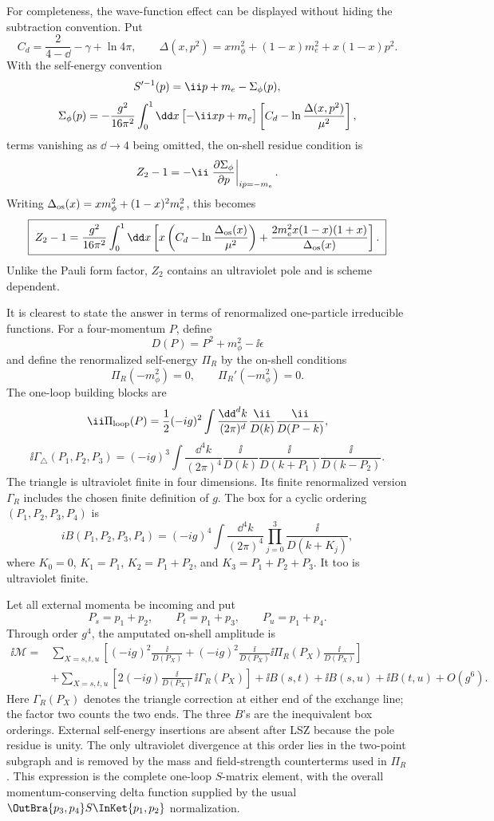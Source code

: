 \begin{enumerate}
For completeness, the wave-function effect can be displayed without hiding
the subtraction convention.  Put
\[
 C_d=\frac{2}{4-\dd}-\gamma+\ln4\pi,\qquad
 \Delta(x,p^2)=xm_\phi^2+(1-x)m_e^2+x(1-x)p^2 .
\]
With the self-energy convention
\[
 S'^{-1}(p)=\ii\sl p+m_e-\Sigma_\phi(p),
\]
\[
 \Sigma_\phi(p)=-\frac{g^2}{16\pi^2}\int_0^1\dd x\,
 \bigl[-\ii x\sl p+m_e\bigr]
 \left[C_d-\ln\frac{\Delta(x,p^2)}{\mu^2}\right],
\]
terms vanishing as \(\dd\to4\) being omitted, the on-shell residue condition
is
\[
 Z_2-1=-\ii\left.
 \frac{\partial\Sigma_\phi}{\partial\sl p}\right|_{i\sl p=-m_e}.
\]
Writing
\(\Delta_{\rm os}(x)=xm_\phi^2+(1-x)^2m_e^2\), this becomes
\[
 \boxed{\;
 Z_2-1=\frac{g^2}{16\pi^2}\int_0^1\dd x
 \left[
 x\left(C_d-\ln\frac{\Delta_{\rm os}(x)}{\mu^2}\right)
 +
 \frac{2m_e^2x(1-x)(1+x)}{\Delta_{\rm os}(x)}
 \right].
 \;}
\]
Unlike the Pauli form factor, \(Z_2\) contains an ultraviolet pole and is
scheme dependent.

It is clearest to state the answer in terms of renormalized one-particle
irreducible functions.  For a four-momentum \(P\), define
\[
 D(P)=P^2+m_\phi^2-\ii\epsilon
\]
and define the renormalized self-energy \(\Pi_R\) by the on-shell conditions
\[
 \Pi_R(-m_\phi^2)=0,\qquad
 \Pi_R'(-m_\phi^2)=0.
\]
The one-loop building blocks are
\[
 \ii\Pi_{\rm loop}(P)
 =\frac12(-ig)^2\int\frac{\dd^dk}{(2\pi)^d}
 \frac{\ii}{D(k)}\frac{\ii}{D(P-k)},
\]
\[
 \ii\Gamma_{\triangle}(P_1,P_2,P_3)
 =(-ig)^3\int\frac{\dd^4k}{(2\pi)^4}
 \frac{\ii}{D(k)}
 \frac{\ii}{D(k+P_1)}
 \frac{\ii}{D(k-P_2)} .
\]
The triangle is ultraviolet finite in four dimensions.  Its finite
renormalized version \(\Gamma_R\) includes the chosen finite definition of
\(g\).  The box for a cyclic ordering \((P_1,P_2,P_3,P_4)\) is
\[
 iB(P_1,P_2,P_3,P_4)
 =(-ig)^4\int\frac{\dd^4k}{(2\pi)^4}
 \prod_{j=0}^{3}\frac{\ii}{D(k+K_j)},
\]
where \(K_0=0\), \(K_1=P_1\), \(K_2=P_1+P_2\), and
\(K_3=P_1+P_2+P_3\).  It too is ultraviolet finite.

Let all external momenta be incoming and put
\[
 P_s=p_1+p_2,\qquad P_t=p_1+p_3,\qquad P_u=p_1+p_4.
\]
Through order \(g^4\), the amputated on-shell amplitude is
\[
\begin{aligned}
 \ii\mathcal M={}&
 \sum_{X=s,t,u}\left[
 (-ig)^2\frac{\ii}{D(P_X)}
 +(-ig)^2\frac{\ii}{D(P_X)}
 \ii\Pi_R(P_X)\frac{\ii}{D(P_X)}
 \right]\\
 &+\sum_{X=s,t,u}
 \left[
 2(-ig)\frac{\ii}{D(P_X)}\,\ii\Gamma_R(P_X)
 \right]
 +\ii B(s,t)+\ii B(s,u)+\ii B(t,u)+O(g^6).
\end{aligned}
\]
Here \(\Gamma_R(P_X)\) denotes the triangle correction at either end of the
exchange line; the factor two counts the two ends.  The three \(B\)'s are
the inequivalent box orderings.  External self-energy insertions are absent
after LSZ because the pole residue is unity.  The only ultraviolet
divergence at this order lies in the two-point subgraph and is removed by
the mass and field-strength counterterms used in \(\Pi_R\).  This expression
is the complete one-loop \(S\)-matrix element, with the overall
momentum-conserving delta function supplied by the usual
\(\OutBra{p_3,p_4}S\InKet{p_1,p_2}\) normalization.


\end{enumerate}
